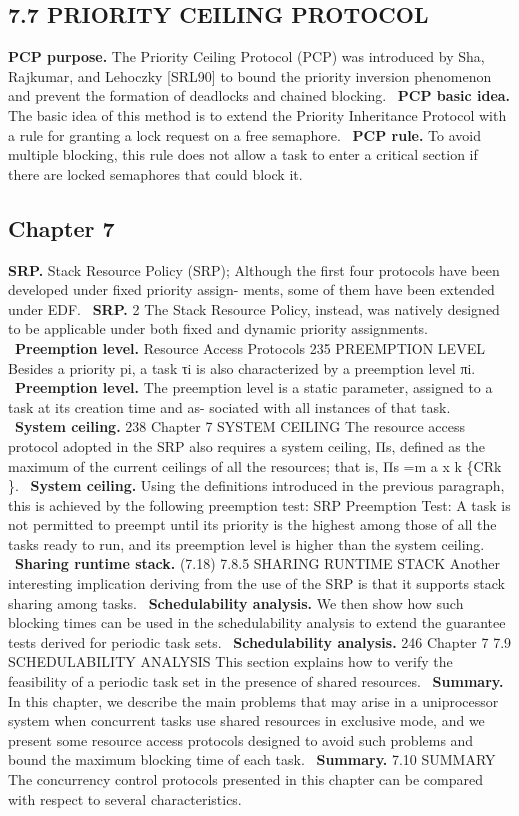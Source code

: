 \documentclass[conference]{IEEEtran}
\begin{document}
\subsection{7.7 PRIORITY CEILING PROTOCOL}
\textbf{PCP purpose.} The Priority Ceiling Protocol (PCP) was introduced by Sha, Rajkumar, and Lehoczky [SRL90] to bound the priority inversion phenomenon and prevent the formation of deadlocks and chained blocking. \cite{Buttazzo2011}\
\textbf{PCP basic idea.} The basic idea of this method is to extend the Priority Inheritance Protocol with a rule for granting a lock request on a free semaphore. \cite{Buttazzo2011}\
\textbf{PCP rule.} To avoid multiple blocking, this rule does not allow a task to enter a critical section if there are locked semaphores that could block it. \cite{Buttazzo2011}\
\subsection{Chapter 7}
\textbf{SRP.} Stack Resource Policy (SRP); Although the ﬁrst four protocols have been developed under ﬁxed priority assign- ments, some of them have been extended under EDF. \cite{Buttazzo2011}\
\textbf{SRP.} 2 The Stack Resource Policy, instead, was natively designed to be applicable under both ﬁxed and dynamic priority assignments. \cite{Buttazzo2011}\
\textbf{Preemption level.} Resource Access Protocols 235 PREEMPTION LEVEL Besides a priority pi, a task τi is also characterized by a preemption level πi. \cite{Buttazzo2011}\
\textbf{Preemption level.} The preemption level is a static parameter, assigned to a task at its creation time and as- sociated with all instances of that task. \cite{Buttazzo2011}\
\textbf{System ceiling.} 238 Chapter 7 SYSTEM CEILING The resource access protocol adopted in the SRP also requires a system ceiling, Πs, deﬁned as the maximum of the current ceilings of all the resources; that is, Πs =m a x k \{CRk \}. \cite{Buttazzo2011}\
\textbf{System ceiling.} Using the deﬁnitions introduced in the previous paragraph, this is achieved by the following preemption test: SRP Preemption Test: A task is not permitted to preempt until its priority is the highest among those of all the tasks ready to run, and its preemption level is higher than the system ceiling. \cite{Buttazzo2011}\
\textbf{Sharing runtime stack.} (7.18) 7.8.5 SHARING RUNTIME STACK Another interesting implication deriving from the use of the SRP is that it supports stack sharing among tasks. \cite{Buttazzo2011}\
\textbf{Schedulability analysis.} We then show how such blocking times can be used in the schedulability analysis to extend the guarantee tests derived for periodic task sets. \cite{Buttazzo2011}\
\textbf{Schedulability analysis.} 246 Chapter 7 7.9 SCHEDULABILITY ANALYSIS This section explains how to verify the feasibility of a periodic task set in the presence of shared resources. \cite{Buttazzo2011}\
\textbf{Summary.} In this chapter, we describe the main problems that may arise in a uniprocessor system when concurrent tasks use shared resources in exclusive mode, and we present some resource access protocols designed to avoid such problems and bound the maximum blocking time of each task. \cite{Buttazzo2011}\
\textbf{Summary.} 7.10 SUMMARY The concurrency control protocols presented in this chapter can be compared with respect to several characteristics. \cite{Buttazzo2011}\
\end{document}
